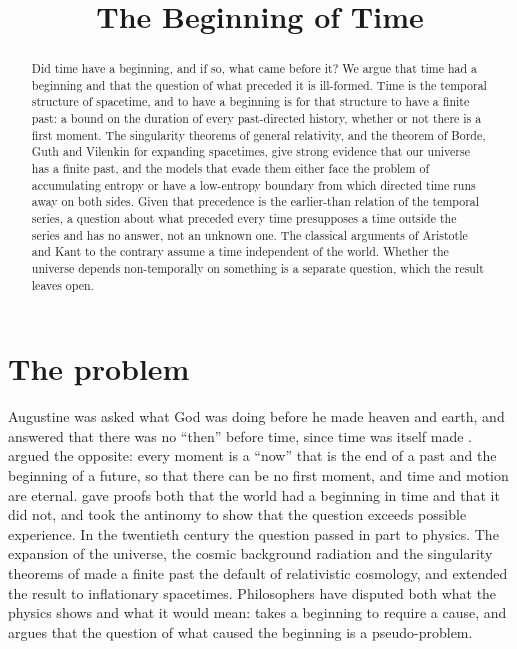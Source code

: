\documentclass{situationist-preprint}
\title{The Beginning of Time}
\begin{document}
\maketitle

\begin{abstract}
Did time have a beginning, and if so, what came before it? We argue that time had a beginning and that the question of what preceded it is ill-formed. Time is the temporal structure of spacetime, and to have a beginning is for that structure to have a finite past: a bound on the duration of every past-directed history, whether or not there is a first moment. The singularity theorems of general relativity, and the theorem of Borde, Guth and Vilenkin for expanding spacetimes, give strong evidence that our universe has a finite past, and the models that evade them either face the problem of accumulating entropy or have a low-entropy boundary from which directed time runs away on both sides. Given that precedence is the earlier-than relation of the temporal series, a question about what preceded every time presupposes a time outside the series and has no answer, not an unknown one. The classical arguments of Aristotle and Kant to the contrary assume a time independent of the world. Whether the universe depends non-temporally on something is a separate question, which the result leaves open.
\end{abstract}

\section{The problem}

Augustine was asked what God was doing before he made heaven and earth, and answered that there was no \enquote{then} before time, since time was itself made \citep[XI.13]{AugustineConfessions}. \citet[VIII.1]{AristotlePhysics} argued the opposite: every moment is a \enquote{now} that is the end of a past and the beginning of a future, so that there can be no first moment, and time and motion are eternal. \citet[A426/B454]{KantCPR} gave proofs both that the world had a beginning in time and that it did not, and took the antinomy to show that the question exceeds possible experience. In the twentieth century the question passed in part to physics. The expansion of the universe, the cosmic background radiation and the singularity theorems of \citet{HawkingPenrose1970} made a finite past the default of relativistic cosmology, and \citet{BordeGuthVilenkin2003} extended the result to inflationary spacetimes. Philosophers have disputed both what the physics shows \citep{Earman1995} and what it would mean: \citet{Craig1979} takes a beginning to require a cause, and \citet{Grunbaum1989} argues that the question of what caused the beginning is a pseudo-problem.
\end{document}
